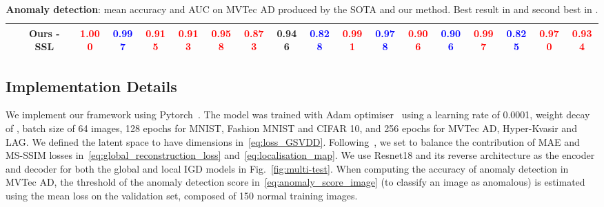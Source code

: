 \documentclass[final]{cvpr}
\begin{document}
\begin{table*}[t]
{\begin{tabular}{@{}cccccccccccccccccc@{}}
         & \textbf{Ours - SSL}                                                 & \textcolor{red}{\textbf{1.000}}     & \textcolor{blue}{\textbf{0.997}}    & \textcolor{red}{\textbf{0.915}}   & \textcolor{red}{\textbf{0.913}}     & \textcolor{red}{\textbf{0.958}}   & \textcolor{red}{\textbf{0.873}} & 0.946 & \textcolor{blue}{\textbf{0.828 }} & \textcolor{red}{\textbf{0.991}} & \textcolor{blue}{\textbf{0.978}} & \textcolor{red}{\textbf{0.906}} &\textcolor{blue}{\textbf{0.906 }}     & \textcolor{red}{\textbf{0.997}}     & \textcolor{blue}{\textbf{0.825}} & \textcolor{red}{\textbf{0.970 }}  & \textcolor{red}{\textbf{0.934}} \\ \bottomrule
\end{tabular}}
\caption{
\textbf{Anomaly detection}: mean accuracy and AUC on MVTec AD produced by the SOTA and our method. Best result in  and second best in .
}
\label{tab:auc_detection_mvtec}
\end{table*}
\subsection{Implementation Details}
We implement our framework using Pytorch~\cite{NEURIPS2019_9015}. The model was trained with Adam optimiser~\cite{kingma2014adam} using a learning rate of 0.0001, weight decay of , batch size of 64 images, 128 epochs for MNIST, Fashion MNIST and CIFAR 10, and 256 epochs for MVTec AD, Hyper-Kvasir and LAG. We defined the latent space to have  dimensions in~\eqref{eq:loss_GSVDD}.
Following~\cite{depthestimation2017, zhao2016loss}, we set  to balance the contribution of MAE and MS-SSIM losses in~\eqref{eq:global_reconstruction_loss} and~\eqref{eq:localisation_map}. 
We use Resnet18 and its reverse architecture as the encoder and decoder for both the global and local IGD models in Fig.~\ref{fig:multi-test}. 
When computing the accuracy of anomaly detection in MVTec AD, the threshold of the anomaly detection score  in~\eqref{eq:anomaly_score_image} (to classify an image as anomalous) is estimated using the mean loss on the validation set, composed of 150 normal training images.
\end{document}
